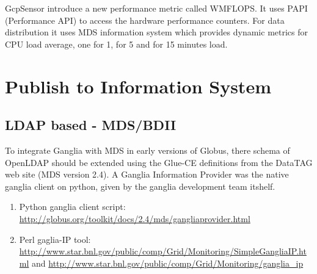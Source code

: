 GcpSensor \cite{gcpsensor} introduce a new performance metric called WMFLOPS. It uses PAPI \cite{papi} (Performance API) to access the hardware performance counters. For data distribution it uses MDS information system which provides dynamic metrics for CPU load average, one for 1, for 5 and for 15 minutes load.
\newpage

\section{Publish to Information System}
\cite{goelagent}

\subsection{LDAP based - MDS/BDII}
To integrate Ganglia with MDS in early versions of Globus, there schema of OpenLDAP should be extended using the Glue-CE definitions from the DataTAG web site (MDS version 2.4). A Ganglia Information Provider was the native ganglia client on python, given by the ganglia development team itshelf.
\begin{enumerate}
  \item Python ganglia client script: \url{http://globus.org/toolkit/docs/2.4/mds/gangliaprovider.html}
  \item Perl gaglia-IP tool: \url{http://www.star.bnl.gov/public/comp/Grid/Monitoring/SimpleGangliaIP.html} and \url{http://www.star.bnl.gov/public/comp/Grid/Monitoring/ganglia\_ip}

\end{enumerate}

\newpage

